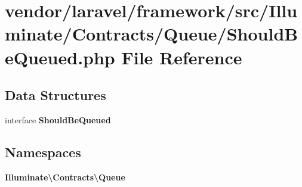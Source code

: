 \section{vendor/laravel/framework/src/\+Illuminate/\+Contracts/\+Queue/\+Should\+Be\+Queued.php File Reference}
\label{_should_be_queued_8php}
\subsection*{Data Structures}
\begin{DoxyCompactItemize}
\item 
interface {\bf Should\+Be\+Queued}
\end{DoxyCompactItemize}
\subsection*{Namespaces}
\begin{DoxyCompactItemize}
\item 
 {\bf Illuminate\textbackslash{}\+Contracts\textbackslash{}\+Queue}
\end{DoxyCompactItemize}
